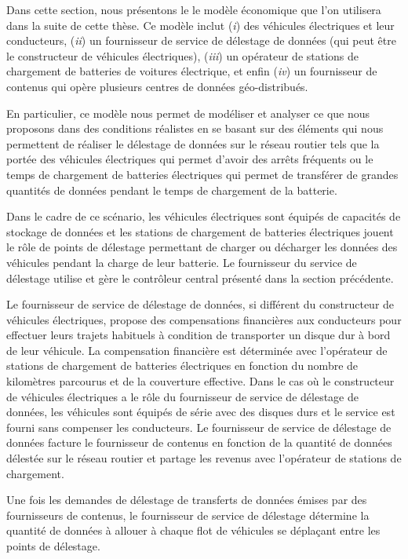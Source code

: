 Dans cette section, nous présentons le le modèle économique que l’on utilisera dans la suite de cette thèse. Ce modèle inclut (\textit{i}) des véhicules électriques et leur conducteurs, (\textit{ii}) un fournisseur de service de délestage de données (qui peut être le constructeur de véhicules électriques), (\textit{iii}) un opérateur de stations de chargement de batteries de voitures électrique, et enfin (\textit{iv}) un fournisseur de contenus qui opère plusieurs centres de données géo-distribués. 
 
 
En particulier, ce modèle nous permet de modéliser et analyser ce que nous proposons dans des conditions réalistes en se basant sur des éléments qui nous permettent de réaliser le délestage de données sur le réseau routier tels que la portée des véhicules électriques qui permet d’avoir des arrêts fréquents ou le temps de chargement de batteries électriques qui permet de transférer de grandes quantités de données pendant le temps de chargement de la batterie.
 
 
Dans le cadre de ce scénario, les véhicules électriques sont équipés de capacités de stockage de données et les stations de chargement de batteries électriques jouent le rôle de points de délestage permettant de charger ou décharger les données des véhicules pendant la charge de leur batterie. Le fournisseur du service de délestage utilise et gère le contrôleur central présenté dans la section précédente. 
 
 
Le fournisseur de service de délestage de données, si différent du constructeur de véhicules électriques, propose des compensations financières aux conducteurs pour effectuer leurs trajets habituels à condition de transporter un disque dur à bord de leur véhicule. La compensation financière est déterminée avec l’opérateur de stations de chargement de batteries électriques en fonction du nombre de kilomètres parcourus et de la couverture effective. Dans le cas où le constructeur de véhicules électriques a le rôle du fournisseur de service de délestage de données, les véhicules sont équipés de série avec des disques durs et le service est fourni sans compenser les conducteurs. Le fournisseur de service de délestage de données facture le fournisseur de contenus en fonction de la quantité de données délestée sur le réseau routier et partage les revenus avec l’opérateur de stations de chargement. 
 
 
Une fois les demandes de délestage de transferts de données émises par des fournisseurs de contenus, le fournisseur de service de délestage détermine la quantité de données à allouer à chaque flot de véhicules se déplaçant entre les points de délestage. 
 
